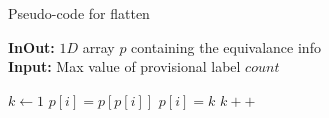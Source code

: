 \begin{algorithm}[ht]
\small
{
	\caption{Pseudo-code for flatten}
	\label{alg:flatten}
	\textbf{InOut:} $1D$ array $p$ containing the equivalance info \\
	\textbf{Input:} Max value of provisional label $count$
	\begin{algorithmic}[1]
		\State $k \gets 1$
				\State $p[i] = p[p[i]]$
			\Else
				\State $p[i] = k$
				\State $k++$
			\EndIf
		\EndFor
	\EndFunction
	\end{algorithmic}	
}
\end{algorithm}
